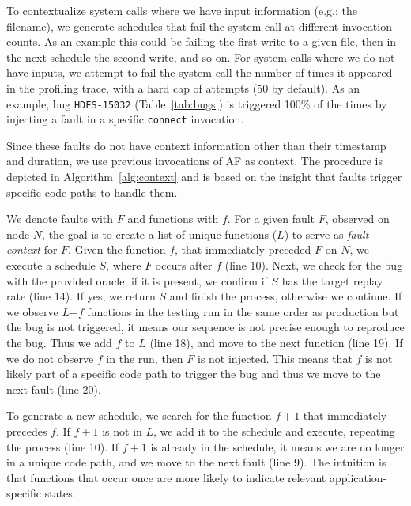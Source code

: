 To contextualize system calls where we have input information (e.g.: the filename), we generate schedules that fail the system call at different invocation counts.
As an example this could be failing the first write to a given file, then in the next schedule the second write, and so on.
For system calls where we do not have inputs, we attempt to fail the system call the number of times it appeared in the profiling trace, with a hard cap of attempts (50 by default).
As an example, bug \texttt{HDFS-15032} (Table~\ref{tab:bugs}) is triggered 100\% of the times by injecting a fault in a specific \texttt{connect} invocation.

 Since these faults do not have context information other than their timestamp and duration, we use previous invocations of AF as context.
The procedure is depicted in Algorithm~\ref{alg:context} and is based on the insight that faults trigger specific code paths to handle them.



We denote faults with $F$ and functions with $f$.
For a given fault $F$, observed on node $N$, the goal is to create a list of unique functions ($L$) to serve as \emph{fault-context} for $F$.
Given the function $f$, that immediately preceded $F$ on $N$, we execute a schedule $S$, where $F$ occurs after $f$ (line 10).
Next, we check for the bug with the provided oracle; if it is present, we confirm if $S$ has the target replay rate (line 14).
If yes, we return $S$ and finish the process, otherwise we continue.
If we observe $L$+$f$ functions in the testing run in the same order as production but the bug is not triggered, it means our sequence is not precise enough to reproduce the bug.
Thus we add $f$ to $L$ (line 18), and move to the next function (line 19).
If we do not observe $f$ in the run, then $F$ is not injected.
This means that $f$ is not likely part of a specific code path to trigger the bug and thus we move to the next fault (line 20).

To generate a new schedule, we search for the function $f+1$ that immediately precedes $f$.
If $f+1$ is not in $L$, we add it to the schedule and execute, repeating the process (line 10).
If $f+1$ is already in the schedule, it means we are no longer in a unique code path, and we move to the next fault (line 9).
The intuition is that functions that occur once are more likely to indicate relevant application-specific states.

